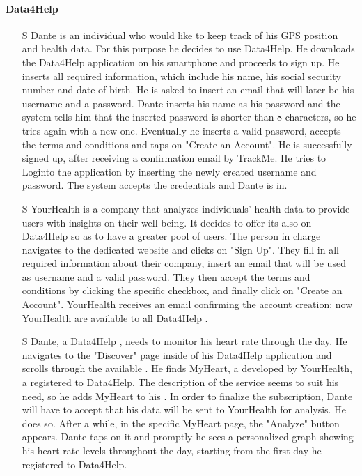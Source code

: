 \documentclass[../../rasd.tex]{subfiles}
\begin{document}
        \paragraph{Data4Help}
        \begin{itemize}

                    \item[S\subs{1}] Dante is an individual who would like to keep track of his GPS position and health data. For this purpose he decides to use Data4Help. He downloads the Data4Help application on his smartphone and proceeds to sign up. He inserts all required information, which include his name, his social security number and date of birth. He is asked to insert an email that will later be his username and a password. Dante inserts his name as his password and the system tells him that the inserted password is shorter than 8 characters, so he tries again with a new one. Eventually he inserts a valid password, accepts the terms and conditions and taps on "Create an Account". He is successfully signed up, after receiving a confirmation email by TrackMe. He tries to Loginto the application by inserting the newly created username and password. The system accepts the credentials and Dante is in.
                    
                    \item[S\subs{2}] YourHealth is a company that analyzes individuals' health data to provide users with insights on their well-being. It decides to offer its  also on Data4Help so as to have a greater pool of users. The person in charge navigates to the  dedicated website and clicks on "Sign Up". They fill in all required information about their company, insert an email that will be used as username and a valid password. They then accept the terms and conditions by clicking the specific checkbox, and finally click on "Create an Account". YourHealth receives an email confirming the account creation: now YourHealth  are available to all Data4Help .
                    
                    \item[S\subs{3}] Dante, a Data4Help , needs to monitor his heart rate through the day. He navigates to the "Discover" page inside of his Data4Help application and scrolls through the available . He finds MyHeart, a  developed by YourHealth, a  registered to Data4Help. The description of the service seems to suit his need, so he adds MyHeart to his . In order to finalize the subscription, Dante will have to accept that his data will be sent to YourHealth for analysis. He does so. After a while, in the specific MyHeart  page, the "Analyze" button appears. Dante taps on it and promptly he sees a personalized graph showing his heart rate levels throughout the day, starting from the first day he registered to Data4Help.


\end{itemize}
\end{document}
